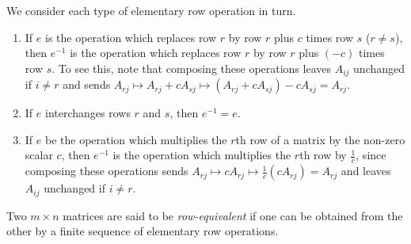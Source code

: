 \documentclass[12pt,letterpaper,reqno]{article}
\numberwithin{equation}{section}
\newcommand{\ti}[1]{\textit{#1}}
\begin{document}
\begin{pf} We consider each type of elementary row operation in turn. 
\begin{enumerate}[(1)]
	\item If $e$ is the operation which replaces row $r$ by row $r$ plus $c$ times row $s$ ($r \neq s$), then $e^{-1}$ is the operation which replaces row $r$ by row $r$ plus $(-c)$ times row $s$. To see this, note that composing these operations leaves $A_{ij}$ unchanged if $i\neq r$ and sends $A_{rj} \mapsto A_{rj}+cA_{sj} \mapsto (A_{rj}+cA_{sj})-cA_{sj}=A_{rj}$.
	\item If $e$ interchanges rows $r$ and $s$, then $e^{-1}=e$.
	\item If $e$ be the operation which multiplies the $r$th row of a matrix by the non-zero scalar $c$, then $e^{-1}$ is the operation which multiplies the $r$th row by $\frac{1}{c}$, since composing these operations sends $A_{rj} \mapsto cA_{rj} \mapsto \frac{1}{c}(cA_{rj})=A_{rj}$ and leaves $A_{ij}$ unchanged if $i \neq r$. 
\end{enumerate}
\end{pf}

\begin{defn}\label{def:row_equivalent_matrices}
	Two $m \times n$ matrices are said to be \ti{row-equivalent} if one can be obtained from the other by a finite sequence of elementary row operations. 
\end{defn}
\end{document}
